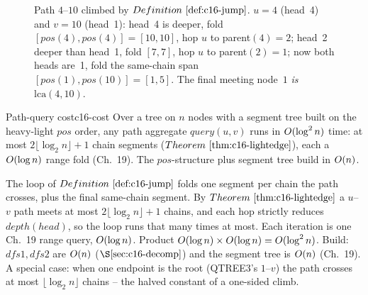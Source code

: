 \begin{figure}[H]
\centering
{}
\caption{Path \(4\)--\(10\) climbed by \(\defref{c16-jump}\).  \(u=4\) (head~4) and \(v=10\) (head~1): head~4 is deeper, fold \([\mathit{pos}(4),\mathit{pos}(4)]=[10,10]\), hop \(u\) to parent\((4)=2\); head~2 deeper than head~1, fold \([7,7]\), hop \(u\) to parent\((2)=1\); now both heads are~1, fold the same-chain span \([\mathit{pos}(1),\mathit{pos}(10)]=[1,5]\).  The final meeting node~\(1\) \emph{is} \(\mathrm{lca}(4,10)\).}
\label{fig:c16-jump}
\end{figure}

\begin{theorem}{Path-query cost}{c16-cost}
Over a tree on \(n\) nodes with a segment tree built on the heavy-light \(\mathit{pos}\) order, any path aggregate \(\mathit{query}(u,v)\) runs in \(O(\log^2 n)\) time: at most \(2\lfloor\log_2 n\rfloor+1\) chain segments (\(\thmref{c16-lightedge}\)), each a \(O(\log n)\) range fold (Ch.~19).  The \(\mathit{pos}\)-structure plus segment tree build in \(O(n)\).
\end{theorem}
\begin{proofbox}
The loop of \(\defref{c16-jump}\) folds one segment per chain the path crosses, plus the final same-chain segment.  By \(\thmref{c16-lightedge}\) a \(u\)--\(v\) path meets at most \(2\lfloor\log_2 n\rfloor+1\) chains, and each hop strictly reduces \(\mathit{depth}(\mathit{head})\), so the loop runs that many times at most.  Each iteration is one Ch.~19 range query, \(O(\log n)\).  Product \(O(\log n)\times O(\log n)=O(\log^2 n)\).  Build: \(\mathit{dfs1},\mathit{dfs2}\) are \(O(n)\) (\(\secref{c16-decomp}\)) and the segment tree is \(O(n)\) (Ch.~19).  A special case: when one endpoint is the root (QTREE3's \(1\)--\(v\)) the path crosses at most \(\lfloor\log_2 n\rfloor\) chains -- the halved constant of a one-sided climb.
\end{proofbox}

